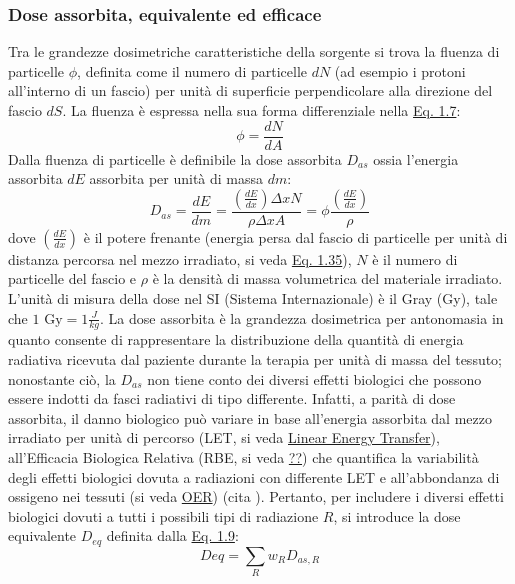 \documentclass[12pt,a4paper,twoside]{report}
\begin{document}
	\subsubsection{Dose assorbita, equivalente ed efficace}
	Tra le grandezze dosimetriche caratteristiche della sorgente si trova la fluenza di particelle $\phi$, definita come il numero di particelle $dN$ (ad esempio i protoni all'interno di un fascio) per unità di superficie perpendicolare alla direzione del fascio $dS$. La fluenza è espressa nella sua forma differenziale nella \hyperref[eq:fluence]{Eq. 1.7}:
	\begin{equation}
		\phi=\frac{dN}{dA}
		\label{eq:fluence}
	\end{equation}
	Dalla fluenza di particelle è definibile la dose assorbita $D_{as}$ ossia l'energia assorbita $dE$ assorbita per unità di massa $dm$:
	\begin{equation}
		D_{as}=\frac{dE}{dm}=\frac{\left(\frac{dE}{dx}\right)\Delta x N}{\rho \Delta x A}=\phi\frac{\left(\frac{dE}{dx}\right)}{\rho}
		\label{eq:dose_as}
	\end{equation}
	dove $\left(\frac{dE}{dx}\right)$ è il potere frenante (energia persa dal fascio di particelle per unità di distanza percorsa nel mezzo irradiato, si veda \hyperref[eq:bethe_bloch]{Eq. 1.35}), $N$ è il numero di particelle del fascio e $\rho$ è la densità di massa volumetrica del materiale irradiato. L'unità di misura della dose nel SI (Sistema Internazionale) è il Gray (Gy), tale che $1\mbox{ Gy}=1\frac{J}{kg}$. La dose assorbita è la grandezza dosimetrica per antonomasia in quanto consente di rappresentare la distribuzione della quantità di energia radiativa ricevuta dal paziente durante la terapia per unità di massa del tessuto; nonostante ciò, la $D_{as}$ non tiene conto dei diversi effetti biologici che possono essere indotti da fasci radiativi di tipo differente. Infatti, a parità di dose assorbita, il danno biologico può variare in base all'energia assorbita dal mezzo irradiato per unità di percorso (LET, si veda \hyperref[par:let]{Linear Energy Transfer}), all'Efficacia Biologica Relativa (RBE, si veda \hyperref[??]{??}) che quantifica la variabilità degli effetti biologici dovuta a radiazioni con differente LET e all'abbondanza di ossigeno nei tessuti (si veda \hyperref[par:oer]{OER}) (cita
	). Pertanto, per includere i diversi effetti biologici dovuti a tutti i possibili tipi di radiazione $R$, si introduce la dose equivalente $D_{eq}$ definita dalla \hyperref[eq:dose_eq]{Eq. 1.9}:
	\begin{equation}
		D{eq}=\sum_{R}w_RD_{as,R}
		\label{eq:dose_eq}
	\end{equation}
\end{document}
